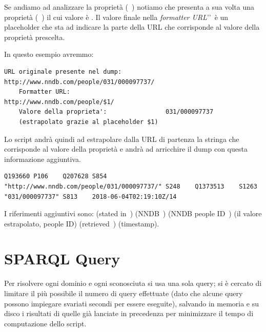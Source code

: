 Se andiamo ad analizzare la proprietà  (~\cite{P1263}) notiamo che presenta a sua volta una proprietà 
 (~\cite{P1630}) il cui valore è . 
Il valore finale  nella \textit{formatter URL}\rq\rq\ è un placeholder che sta ad indicare la parte della URL che corrisponde al valore della proprietà prescelta. 

In questo esempio avremmo:
\begin{lstlisting}[style=QuickstatementsStyle, caption=Esempio di formatter URL]
    URL originale presente nel dump:        http://www.nndb.com/people/031/000097737/
    Formatter URL:                          http://www.nndb.com/people/$1/
    Valore della proprieta':                031/000097737
    (estrapolato grazie al placeholder $1)
\end{lstlisting}

Lo script andrà quindi ad estrapolare dalla URL di partenza la stringa  che corrisponde al valore della proprietà  e andrà ad arricchire il dump 
con questa informazione aggiuntiva.

\begin{lstlisting}[style=QuickstatementsStyle, caption=Risultato dello script]
    Q193660	P106	Q207628	S854	"http://www.nndb.com/people/031/000097737/"	S248	Q1373513	S1263	"031/000097737"	S813	2018-06-04T02:19:10Z/14
\end{lstlisting}

I riferimenti aggiuntivi sono: 
 (stated in~\cite{P248})
 (NNDB~\cite{Q1373513})
 (NNDB people ID~\cite{P1263})
 (il valore estrapolato, people ID)
 (retrieved~\cite{P813})
 (timestamp).

\section{SPARQL Query}
Per risolvere ogni dominio e ogni  sconosciuta si usa una sola query; si è cercato di limitare il più possibile il numero di query effettuate 
(dato che alcune query possono impiegare svariati secondi per essere eseguite), 
salvando in memoria e su disco i risultati di quelle già lanciate in precedenza per minimizzare il tempo di computazione dello script.

